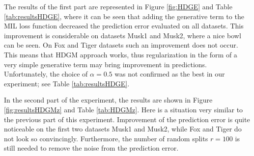 The results of the first part are represented in Figure \ref{fig:HDGE} and Table \ref{tab:resultsHDGE}, where it can be seen that adding the generative term to the MIL loss function decreased the prediction error evaluated on all datasets. This improvement is considerable on datasets Musk1 and Musk2, where a nice bowl can be seen. On Fox and Tiger datasets such an improvement does not occur. This means that HDGM approach works, thus regularization in the form of a very simple generative term may bring improvement in predictions. Unfortunately, the choice of $\alpha=0.5$ was not confirmed as the best in our experiment; see Table \ref{tab:resultsHDGE}.   

In the second part of the experiment, the results are shown in Figure \ref{fig:resultsHDGMz} and Table \ref{tab:HDGMz}. Here is a situation very similar to the previous part of this experiment. Improvement of the prediction error is quite noticeable on the first two datasets Musk1 and Musk2, while Fox and Tiger do not look so convincingly. Furthermore, the number of random splits $r=100$ is still needed to remove the noise from the prediction error. 

